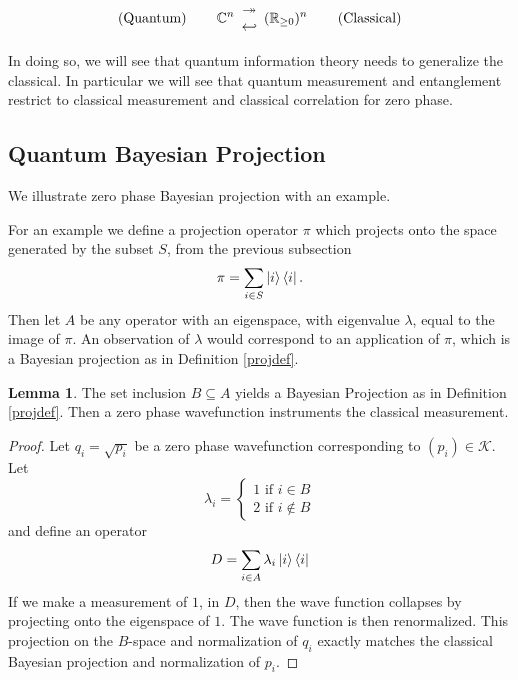 \documentclass[12pt,a4paper]{article}
\theoremstyle{myrule}
\theoremstyle{postulate}
\theoremstyle{definition}
\newtheorem{lemma}[theorem]{Lemma}
\begin{document}
{
\renewcommand{\arraystretch}{0.1}
\[
\text{(Quantum)} \hspace{0.3 in}
\mathbb{C}^n \begin{array}{c} \twoheadrightarrow \\ \hookleftarrow \end{array}
(\mathbb{R}_{\ge 0})^n
\hspace{0.3 in} \text{(Classical)} 
\]
}

In doing so, we will see that quantum information theory needs to generalize the classical.  In particular we will see that quantum measurement and entanglement restrict to classical measurement and classical correlation for zero phase.

\subsection{Quantum Bayesian Projection}
We illustrate zero phase Bayesian projection with an example.

For an example we define a projection operator $\pi$ which projects onto the space generated by the subset $S$, from the previous subsection
\[
\pi = \sum_{i \in S} \ket{i} \bra{i}.
\]
Then let $A$ be any operator with an eigenspace, with eigenvalue $\lambda$, equal to the image of $\pi$.  An observation of $\lambda$ would correspond to an application of $\pi$, which is a Bayesian projection as in Definition \ref{projdef}.
\begin{lemma}
  The set inclusion $B \subseteq A$ yields a Bayesian Projection as in Definition \ref{projdef}.  Then a zero phase wavefunction instruments the classical measurement.
\end{lemma}
\begin{proof}
Let $q_i = \sqrt{p_i}$ be a zero phase wavefunction corresponding to $(p_i) \in \mathcal{K}$.  Let
  \[
  \lambda_i = \left\{ \begin{array}{ll} 1 \text{ if } i \in B \\ 2 \text{ if } i \not \in B \end{array} \right.
  \]
and define an operator
\[
  D = \sum_{i \in A} \lambda_i \ket{i} \bra{i}
\]
If we make a measurement of $1$, in $D$, then the wave function collapses by projecting onto the eigenspace of $1$. The wave function is then renormalized.  This projection on the $B$-space and normalization of $q_i$ exactly matches the classical Bayesian projection and normalization of $p_i$.
\end{proof}
\end{document}
